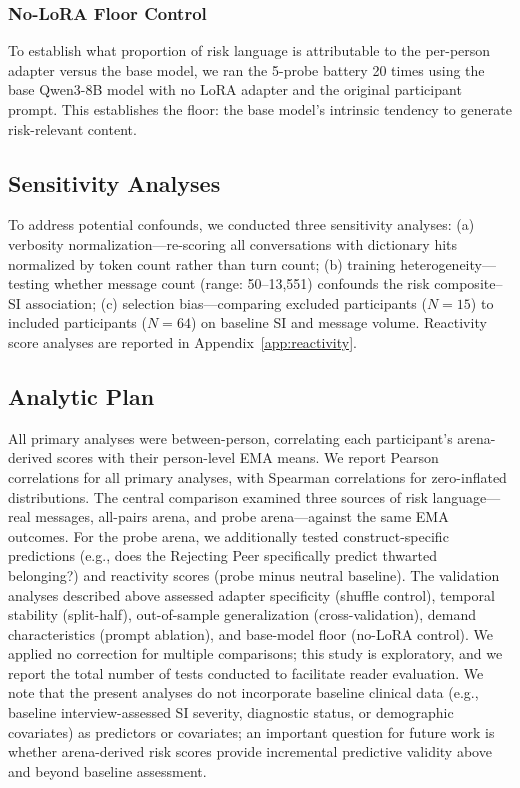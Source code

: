 \documentclass[review,12pt,authoryear]{elsarticle}
\begin{document}
\subsubsection{No-LoRA Floor Control}

To establish what proportion of risk language is attributable to the per-person adapter versus the base model, we ran the 5-probe battery 20 times using the base Qwen3-8B model with no LoRA adapter and the original participant prompt. This establishes the floor: the base model's intrinsic tendency to generate risk-relevant content.

\subsection{Sensitivity Analyses}

To address potential confounds, we conducted three sensitivity analyses: (a) verbosity normalization---re-scoring all conversations with dictionary hits normalized by token count rather than turn count; (b) training heterogeneity---testing whether message count (range: 50--13,551) confounds the risk composite--SI association; (c) selection bias---comparing excluded participants ($N = 15$) to included participants ($N = 64$) on baseline SI and message volume. Reactivity score analyses are reported in Appendix~\ref{app:reactivity}.

\subsection{Analytic Plan}

All primary analyses were between-person, correlating each participant's arena-derived scores with their person-level EMA means. We report Pearson correlations for all primary analyses, with Spearman correlations for zero-inflated distributions. The central comparison examined three sources of risk language---real messages, all-pairs arena, and probe arena---against the same EMA outcomes. For the probe arena, we additionally tested construct-specific predictions (e.g., does the Rejecting Peer specifically predict thwarted belonging?) and reactivity scores (probe minus neutral baseline). The validation analyses described above assessed adapter specificity (shuffle control), temporal stability (split-half), out-of-sample generalization (cross-validation), demand characteristics (prompt ablation), and base-model floor (no-LoRA control). We applied no correction for multiple comparisons; this study is exploratory, and we report the total number of tests conducted to facilitate reader evaluation. We note that the present analyses do not incorporate baseline clinical data (e.g., baseline interview-assessed SI severity, diagnostic status, or demographic covariates) as predictors or covariates; an important question for future work is whether arena-derived risk scores provide incremental predictive validity above and beyond baseline assessment.
\end{document}
